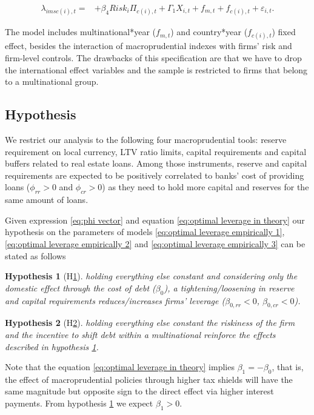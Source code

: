 \documentclass[12pt]{article}
\newtheorem{hyp}{Hypothesis}
\begin{document}
	\begin{equation}
	\begin{aligned}
	\lambda_{imsc(i),t}=&+\beta_4Risk_{i}\Pi_{c(i),t}+\Gamma_1 X_{i,t}+f_{m,t}+f_{c(i),t}+\varepsilon_{i,t}.
	\label{eq:optimal leverage empirically 3}
	\end{aligned}
	\end{equation}
	
	The model includes multinational*year ($f_{m,t}$) and country*year ($f_{c(i),t}$) fixed effect, besides the interaction of macroprudential indexes with firms' risk and firm-level controls. The drawbacks of this specification are that we have to drop the international effect variables and the sample is restricted to firms that belong to a multinational group. 		
	
		\subsection{Hypothesis}
	\label{subsec:hypothesis}
	We restrict our analysis to the following four macroprudential tools: reserve requirement on local currency, LTV ratio limits, capital requirements and capital buffers related to real estate loans. Among those instruments, reserve and capital requirements are expected to be positively correlated to banks' cost of providing loans ($\phi_{rr}>0$ and $\phi_{cr}>0$) as they need to hold more capital and reserves for the same amount of loans. 
	
	Given expression \ref{eq:phi vector} and equation 	\ref{eq:optimal leverage in theory} our hypothesis on the parameters of models \ref{eq:optimal leverage empirically 1}, \ref{eq:optimal leverage empirically 2} and \ref{eq:optimal leverage empirically 3} can be stated as follows

	\begin{hyp}[H\ref{hyp:H1}] \label{hyp:H1}
		holding everything else constant and considering only the domestic effect through the cost of debt ($\beta_{0}$), a tightening/loosening in reserve and capital requirements reduces/increases firms' leverage ($\beta_{0,rr}<0$, $\beta_{0,cr}<0$).
	\end{hyp}
	\begin{hyp}[H\ref{hyp:H2}] \label{hyp:H2}
		holding everything else constant the riskiness of the firm and the incentive to shift debt within a multinational reinforce the effects described in hypothesis \ref{hyp:H1}. 
	\end{hyp}
Note that the equation \ref{eq:optimal leverage in theory} implies $\beta_{1}=-\beta_{0}$, that is, the effect of macroprudential policies through higher tax shields will have the same magnitude but opposite sign to the direct effect via higher interest payments. From hypothesis \ref{hyp:H1} we expect $\beta_{1}>0$.
	 
\end{document}
